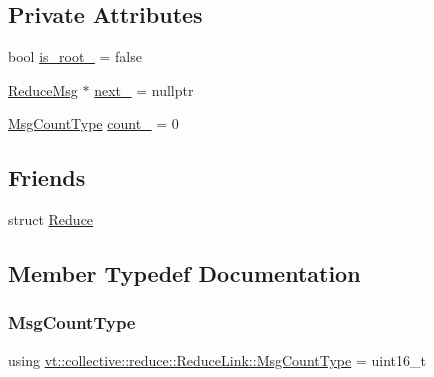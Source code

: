 \subsection*{Private Attributes}
\begin{DoxyCompactItemize}
\item 
bool \hyperlink{structvt_1_1collective_1_1reduce_1_1_reduce_link_a6580f48704b511253b50f63a8ccf1b68}{is\+\_\+root\+\_\+} = false
\item 
\hyperlink{structvt_1_1collective_1_1reduce_1_1_reduce_msg}{Reduce\+Msg} $\ast$ \hyperlink{structvt_1_1collective_1_1reduce_1_1_reduce_link_ab98d170585623118aed65e753d391313}{next\+\_\+} = nullptr
\item 
\hyperlink{structvt_1_1collective_1_1reduce_1_1_reduce_link_a041d928748b444f18ea3ddb72fdbe08a}{Msg\+Count\+Type} \hyperlink{structvt_1_1collective_1_1reduce_1_1_reduce_link_aaad578073c92d79401b0d900a8851985}{count\+\_\+} = 0
\end{DoxyCompactItemize}
\subsection*{Friends}
\begin{DoxyCompactItemize}
\item 
struct \hyperlink{structvt_1_1collective_1_1reduce_1_1_reduce_link_a46b0fc47c92fae92b73cff2d9b4c1242}{Reduce}
\end{DoxyCompactItemize}


\subsection{Member Typedef Documentation}
\mbox{\label{structvt_1_1collective_1_1reduce_1_1_reduce_link_a041d928748b444f18ea3ddb72fdbe08a}} 
\subsubsection{\texorpdfstring{Msg\+Count\+Type}{MsgCountType}}
{\footnotesize\ttfamily using \hyperlink{structvt_1_1collective_1_1reduce_1_1_reduce_link_a041d928748b444f18ea3ddb72fdbe08a}{vt\+::collective\+::reduce\+::\+Reduce\+Link\+::\+Msg\+Count\+Type} =  uint16\+\_\+t}



